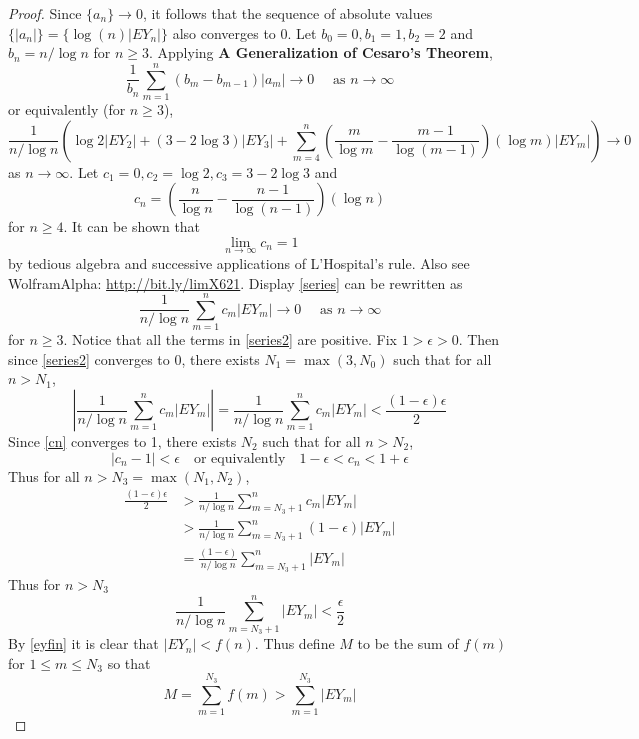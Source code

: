 \documentclass[letterpaper, 12pt]{article}
\begin{document}
\begin{proof}
Since $\{a_n\} \to 0$, it follows that the sequence of absolute values $\{|a_n|\} = \{\log(n)|EY_n|\}$ also converges to 0. 
Let $b_0 = 0, b_1=1, b_2=2$ and $b_n = n/\log n$ for $n \geq 3$. 
Applying \textbf{A Generalization of Cesaro's Theorem},
\[
\frac{1}{b_n} \sum_{m=1}^n (b_m - b_{m-1})|a_m| \to 0
\quad\text{ as }
n \to \infty
\]
or equivalently (for $n \geq 3$),
\begin{equation}
\frac{1}{n/ \log n} 
\left(
\log 2|EY_2|
+ 
(3-2\log 3)|EY_3|
+
\sum_{m=4}^n 
\left(
\frac{m}{\log m} - \frac{m-1}{\log (m-1)} 
\right)
(\log m) |E Y_m| 
\right)
\to 
0 
\label{series}
\end{equation}
as $n \to \infty$.
Let $c_1 = 0, c_2 = \log 2, c_3 = 3- 2\log 3$ and 
\[
c_n = \left(\frac{n}{\log n} - \frac{n-1}{\log (n-1)} \right) (\log n)
\]
for $n \geq 4$.
It can be shown that
\begin{equation}
\lim_{n \to \infty} c_n = 1
\label{cn}
\end{equation}
by tedious algebra and successive applications of L'Hospital's rule. Also see WolframAlpha: \url{http://bit.ly/limX621}. 
Display
\eqref{series} can be rewritten as 
\begin{equation}
\frac{1}{n/ \log n} \sum_{m=1}^n c_m |E Y_m| \to 0 
\quad\text{ as }
n \to \infty
\label{series2}
\end{equation}
for $n \geq 3$.
Notice that all the terms in \eqref{series2} are positive.
Fix $1 > \epsilon > 0$. Then since \eqref{series2} converges to $0$, there exists $N_1 = \max(3, N_0)$ such that for all $n>N_1$,
\[
\left\lvert
\frac{1}{n/ \log n} \sum_{m=1}^n c_m |E Y_m|
\right\rvert 
=
\frac{1}{n/ \log n} \sum_{m=1}^n c_m |E Y_m| 
<
\frac{(1-\epsilon)\epsilon}{2}
\]
Since \eqref{cn} converges to 1, there exists $N_2$ such that for all $n > N_2$,
\[
|c_n - 1| < \epsilon
\quad
\text{or equivalently}
\quad
1-\epsilon < c_n < 1+\epsilon
\]
Thus for all $n > N_3 = \max(N_1, N_2)$,
\begin{align*}
\frac{(1-\epsilon)\epsilon}{2}
&>
\frac{1}{n/ \log n} \sum_{m=N_3 + 1}^n c_m |E Y_m|
\\
&>
\frac{1}{n/ \log n} \sum_{m=N_3 + 1}^n (1-\epsilon) |E Y_m|
\\
&=
\frac{(1-\epsilon)}{n/ \log n} \sum_{m=N_3 + 1}^n |E Y_m|
\end{align*}
Thus for $n > N_3$
\[
\frac{1}{n/ \log n} \sum_{m=N_3 + 1}^n |E Y_m| < \frac{\epsilon}{2}
\]
By \eqref{eyfin} it is clear that $|EY_n| < f(n)$. Thus
define $M$ to be the sum of $f(m)$ for $1 \leq m \leq N_3$ so that 
\[
M = \sum_{m=1}^{N_3} f(m) > \sum_{m=1}^{N_3} |EY_m|
\]
\end{proof}
\end{document}
